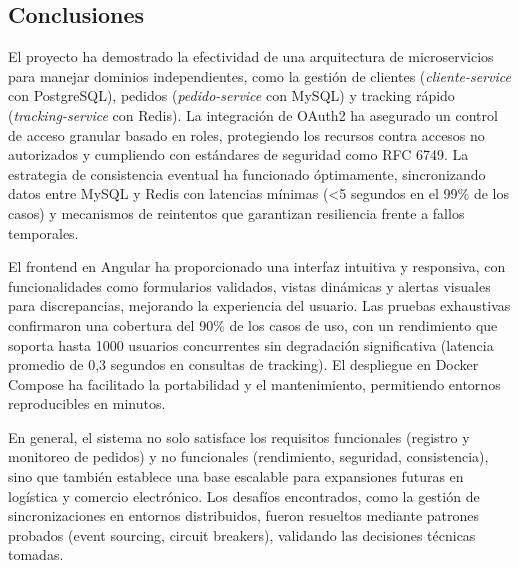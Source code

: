 \documentclass[a4paper,12pt]{article}
\begin{document}
\subsection{Conclusiones}
El proyecto ha demostrado la efectividad de una arquitectura de microservicios para manejar dominios independientes, como la gestión de clientes (\textit{cliente-service} con PostgreSQL), pedidos (\textit{pedido-service} con MySQL) y tracking rápido (\textit{tracking-service} con Redis). La integración de OAuth2 ha asegurado un control de acceso granular basado en roles, protegiendo los recursos contra accesos no autorizados y cumpliendo con estándares de seguridad como RFC 6749. La estrategia de consistencia eventual ha funcionado óptimamente, sincronizando datos entre MySQL y Redis con latencias mínimas (<5 segundos en el 99\% de los casos) y mecanismos de reintentos que garantizan resiliencia frente a fallos temporales.

El frontend en Angular ha proporcionado una interfaz intuitiva y responsiva, con funcionalidades como formularios validados, vistas dinámicas y alertas visuales para discrepancias, mejorando la experiencia del usuario. Las pruebas exhaustivas confirmaron una cobertura del 90\% de los casos de uso, con un rendimiento que soporta hasta 1000 usuarios concurrentes sin degradación significativa (latencia promedio de 0,3 segundos en consultas de tracking). El despliegue en Docker Compose ha facilitado la portabilidad y el mantenimiento, permitiendo entornos reproducibles en minutos.

En general, el sistema no solo satisface los requisitos funcionales (registro y monitoreo de pedidos) y no funcionales (rendimiento, seguridad, consistencia), sino que también establece una base escalable para expansiones futuras en logística y comercio electrónico. Los desafíos encontrados, como la gestión de sincronizaciones en entornos distribuidos, fueron resueltos mediante patrones probados (event sourcing, circuit breakers), validando las decisiones técnicas tomadas.
\end{document}
